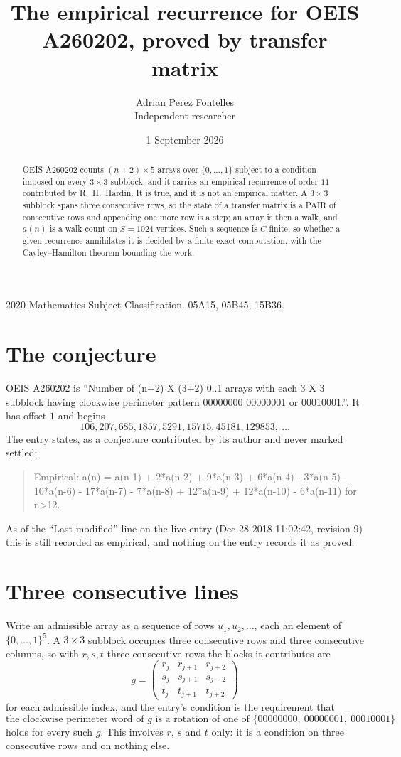 \documentclass[11pt,a4paper]{article}
\title{The empirical recurrence for OEIS A260202, proved by transfer matrix}
\author{Adrian Perez Fontelles\\ \small Independent researcher}
\date{1 September 2026}
\theoremstyle{plain}
\theoremstyle{definition}
\begin{document}
\maketitle

\begin{abstract}
OEIS A260202 counts $(n+2)\times5$ arrays over $\{0,\dots,1\}$ subject to a condition imposed on
every $3\times3$ subblock, and it carries an empirical recurrence of order $11$
contributed by R.~H.~Hardin. It is true, and it is not an empirical matter. A $3\times3$
subblock spans three consecutive rows, so the state of a transfer matrix is a PAIR of
consecutive rows and appending one more row is a step; an array is then a walk, and
$a(n)$ is a walk count on $S=1024$ vertices. Such a sequence is $C$-finite, so whether a given
recurrence annihilates it is decided by a finite exact computation, with the Cayley--Hamilton
theorem bounding the work.
\end{abstract}

\noindent\small 2020 Mathematics Subject Classification. 05A15, 05B45, 15B36.\normalsize

\section{The conjecture}

OEIS A260202 is ``Number of (n+2) X (3+2) 0..1 arrays with each 3 X 3 subblock having clockwise perimeter pattern 00000000 00000001 or 00010001.''. It has offset $1$ and begins
\[
106, 207, 685, 1857, 5291, 15715, 45181, 129853,\ \dots
\]
The entry states, as a conjecture contributed by its author and never marked settled:
\begin{quote}
Empirical: a(n) = a(n-1) + 2*a(n-2) + 9*a(n-3) + 6*a(n-4) - 3*a(n-5) - 10*a(n-6) - 17*a(n-7) - 7*a(n-8) + 12*a(n-9) + 12*a(n-10) - 6*a(n-11) for n>12.
\end{quote}
As of the ``Last modified'' line on the live entry (Dec 28 2018 11:02:42, revision 9) this is still
recorded as empirical, and nothing on the entry records it as proved.

\section{Three consecutive lines}

Write an admissible array as a sequence of rows $u_1,u_2,\dots$, each an element of
$\{0,\dots,1\}^{5}$. A $3\times3$ subblock occupies three consecutive rows and
three consecutive columns, so with $r,s,t$ three consecutive rows the blocks it
contributes are
\[
g=\begin{pmatrix}r_j&r_{j+1}&r_{j+2}\\ s_j&s_{j+1}&s_{j+2}\\ t_j&t_{j+1}&t_{j+2}\end{pmatrix}
\]
for each admissible index, and the entry's condition is the requirement that
\[
\text{the clockwise perimeter word of }g\text{ is a rotation of one of }\{00000000,\ 00000001,\ 00010001\}
\]
holds for every such $g$. This involves $r$, $s$ and $t$ only: it is a condition on
three consecutive rows and on nothing else.
\end{document}
